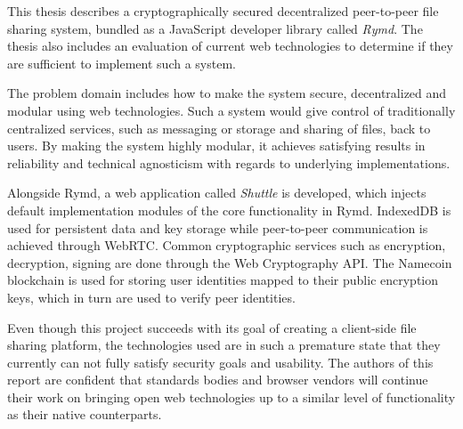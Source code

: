 %

This thesis describes a cryptographically secured decentralized peer-to-peer file sharing system, bundled as a JavaScript developer library called \emph{Rymd}. The thesis also includes an evaluation of current web technologies to determine if they are sufficient to implement such a system.

The problem domain includes how to make the system secure, decentralized and modular using web technologies. Such a system would give control of traditionally centralized services, such as messaging or storage and sharing of files, back to users. By making the system highly modular, it achieves satisfying results in reliability and technical agnosticism with regards to underlying implementations.

Alongside Rymd, a web application called \emph{Shuttle} is developed, which injects default implementation modules of the core functionality in Rymd. IndexedDB is used for persistent data and key storage while peer-to-peer communication is achieved through WebRTC. Common cryptographic services such as encryption, decryption, signing are done through the Web Cryptography API. The Namecoin blockchain is used for storing user identities mapped to their public encryption keys, which in turn are used to verify peer identities.

Even though this project succeeds with its goal of creating a client-side file sharing platform, the technologies used are in such a premature state that they currently can not fully satisfy security goals and usability. The authors of this report are confident that standards bodies and browser vendors will continue their work on bringing open web technologies up to a similar level of functionality as their native counterparts.
